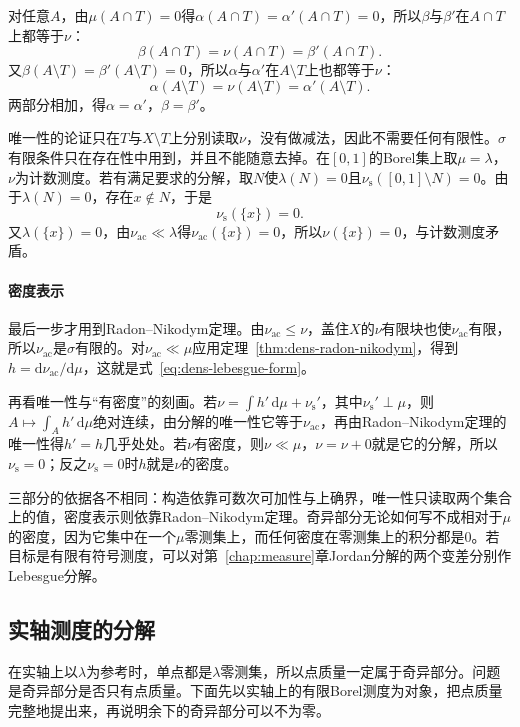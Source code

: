 对任意$A$，由$\mu(A\cap T)=0$得$\alpha(A\cap T)=\alpha'(A\cap T)=0$，所以$\beta$与$\beta'$在$A\cap T$上都等于$\nu$：
\[
\beta(A\cap T)=\nu(A\cap T)=\beta'(A\cap T).
\]
又$\beta(A\setminus T)=\beta'(A\setminus T)=0$，所以$\alpha$与$\alpha'$在$A\setminus T$上也都等于$\nu$：
\[
\alpha(A\setminus T)=\nu(A\setminus T)=\alpha'(A\setminus T).
\]
两部分相加，得$\alpha=\alpha'$，$\beta=\beta'$。

唯一性的论证只在$T$与$X\setminus T$上分别读取$\nu$，没有做减法，因此不需要任何有限性。$\sigma$有限条件只在存在性中用到，并且不能随意去掉。在$[0,1]$的Borel集上取$\mu=\lambda$，$\nu$为计数测度。若有满足要求的分解，取$N$使$\lambda(N)=0$且$\nu_{\mathrm s}([0,1]\setminus N)=0$。由于$\lambda(N)=0$，存在$x\notin N$，于是
\[
\nu_{\mathrm s}(\{x\})=0 .
\]
又$\lambda(\{x\})=0$，由$\nu_{\mathrm{ac}}\ll\lambda$得$\nu_{\mathrm{ac}}(\{x\})=0$，所以$\nu(\{x\})=0$，与计数测度矛盾。

\paragraph{密度表示}
最后一步才用到Radon–Nikodym定理。由$\nu_{\mathrm{ac}}\leq\nu$，盖住$X$的$\nu$有限块也使$\nu_{\mathrm{ac}}$有限，所以$\nu_{\mathrm{ac}}$是$\sigma$有限的。对$\nu_{\mathrm{ac}}\ll\mu$应用定理~\ref{thm:dens-radon-nikodym}，得到$h=\mathrm d\nu_{\mathrm{ac}}/\mathrm d\mu$，这就是式~\eqref{eq:dens-lebesgue-form}。

再看唯一性与“有密度”的刻画。若$\nu=\int h'\,\mathrm d\mu+\nu_{\mathrm s}'$，其中$\nu_{\mathrm s}'\perp\mu$，则$A\mapsto\int_Ah'\,\mathrm d\mu$绝对连续，由分解的唯一性它等于$\nu_{\mathrm{ac}}$，再由Radon–Nikodym定理的唯一性得$h'=h$几乎处处。若$\nu$有密度，则$\nu\ll\mu$，$\nu=\nu+0$就是它的分解，所以$\nu_{\mathrm s}=0$；反之$\nu_{\mathrm s}=0$时$h$就是$\nu$的密度。

三部分的依据各不相同：构造依靠可数次可加性与上确界，唯一性只读取两个集合上的值，密度表示则依靠Radon–Nikodym定理。奇异部分无论如何写不成相对于$\mu$的密度，因为它集中在一个$\mu$零测集上，而任何密度在零测集上的积分都是$0$。若目标是有限有符号测度，可以对第~\ref{chap:measure}章Jordan分解的两个变差分别作Lebesgue分解。

\subsection{实轴测度的分解}
\label{sec:dens-real-line-decomposition}

在实轴上以$\lambda$为参考时，单点都是$\lambda$零测集，所以点质量一定属于奇异部分。问题是奇异部分是否只有点质量。下面先以实轴上的有限Borel测度为对象，把点质量完整地提出来，再说明余下的奇异部分可以不为零。

